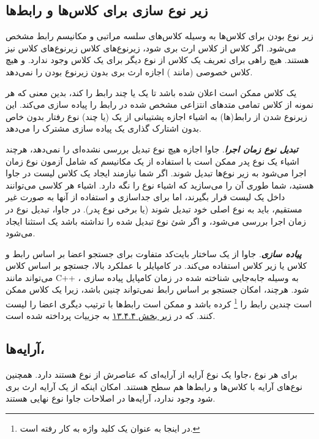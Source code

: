 \documentclass[a4paper,12pt]{report}
\newcommand{\lrm}[1]{\textcolor{steelBlue}{\lr{\texttt{#1}}}}
\begin{document}
	\subsection{
	زیر نوع سازی برای کلاس‌ها و رابط‌ها}
	زیر نوع بودن برای کلاس‌ها به وسیله کلاس‌های سلسه مراتبی و مکانیسم رابط مشخص می‌شود.
	اگر کلاس
	\lrm{A}
	از کلاس 
	\lrm{B}
	ارث بری شود، زیر‌نوع‌های کلاس 
	\lrm{A}
	زیرنوع‌های کلاس
	\lrm{B}
	نیز هستند. هیچ راهی‌ برای تعریف یک کلاس از نوع دیگر برای یک کلاس وجود ندارد.
	و هیچ کلاس خصوصی (مانند 
	)
	اجازه ارث بری بدون زیرنوع بودن را نمی‌دهد. 
	
	یک کلاس ممکن است اعلان شده باشد تا یک یا چند رابط را 
	 \lrm{implement}
	کند، بدین معنی که هر نمونه از کلاس تمامی متد‌های انتزاعی مشخص شده در رابط را پیاده سازی می‌کند.
	این زیرنوع شدن از رابط‌(ها) به اشیاء اجازه پشتیبانی از یک (یا چند) نوع رفتار بدون خاص بدون اشتارک گذاری یک پیاده سازی مشترک را می‌دهد.
	
	
	\textbf{\textit{
	تبدیل نوع زمان اجرا}}. جاوا اجازه هیچ نوع تبدیل بررسی نشده‌ای را نمی‌دهد، هرچند اشیاء یک نوع پدر ممکن است با استفاده از یک مکانیسم که شامل آزمون نوع زمان اجرا می‌شود به زیر نوع‌ها  تبدیل شوند. اگر شما نیازمند ایجاد یک کلاس لیست در جاوا هستید، شما طوری آن را می‌سازید که اشیاء نوع  
	\lrm{Object}
	را نگه دارد. اشیاء هر کلاسی می‌توانند داخل یک لیست قرار بگیرند، اما برای جداسازی و استفاده از آنها به صورت غیر مستقیم، باید به نوع اصلی خود تبدیل شوند (یا برخی نوع پدر). 
	در جاوا، تبدیل نوع در زمان اجرا بررسی می‌شود، و اگر شئ نوع تبدیل شده را نداشته باشد یک استثنا ایجاد می‌شود.
	
	\textbf{\textit{
		پیاده سازی}}. جاوا از یک ساختار بایت‌کد متفاوت برای جستجو اعضا بر اساس رابط و کلاس یا زیر کلاس استفاده می‌کند. در کامپایلر با عملکرد بالا، جستچو بر اساس کلاس می‌تواند مانند 
	C++
	، به وسیله جابه‌جایی
	 شناخته شده در زمان کامپایل پیاده سازی شود. هرچند، امکان جستجو بر اساس رابط نمی‌تواند چنین باشد، زیرا یک کلاس ممکن است چندین رابط را
	\footnote{
	در اینجا به عنوان یک کلید واژه به کار رفته است.}
	کرده باشد و ممکن است رابط‌ها با ترتیب دیگری اعضا را لیست کنند. که در 
	\hyperref[subsec4:sec4:chap13]{
	زیر بخش ۱۳.۴.۴} به جزییات پرداخته شده است.
	
	\subsection{
	آرایه‌ها، }
	برای هر نوع 
	\lrm{T}
	،جاوا یک نوع آرایه 
	\lrm{T[]}
	از آرایه‌ای که عناصرش از نوع 
	\lrm{T}
	هستند دارد. همچنین نوع‌های آرایه با کلاس‌ها و رابط‌ها هم سطح هستند. 
	امکان اینکه از یک آرایه ارث بری شود وجود ندارد، آرایه‌ها در اصلاحات جاوا نوع نهایی هستند.
	
\end{document}
